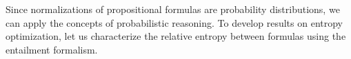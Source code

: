 

Since normalizations of propositional formulas are probability distributions, we can apply the concepts of probabilistic reasoning.
To develop results on entropy optimization, let us characterize the relative entropy between formulas using the entailment formalism.

